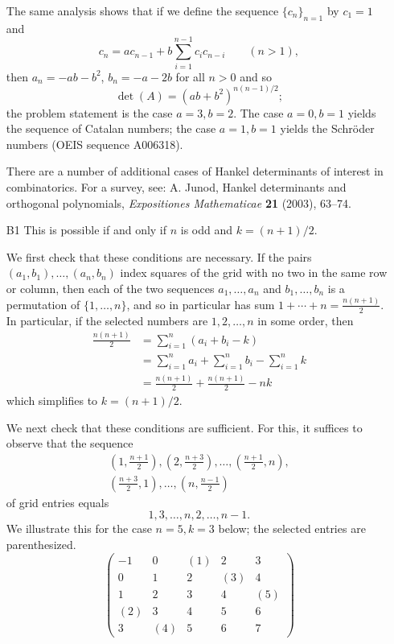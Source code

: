 \documentclass[amssymb,twocolumn,pra,10pt,aps]{revtex4-1}
\begin{document}
\begin{itemize}
The same analysis shows that if we define the sequence $\{c_n\}_{n=1}$ by
$c_1 = 1$ and
\[
c_n = a c_{n-1} + b \sum_{i=1}^{n-1} c_i c_{n-i} \qquad (n > 1),
\]
then  $a_n = -ab-b^2$, $b_n = -a-2b$ for all $n>0$ and so
\[
\det(A) = (ab+b^2)^{n(n-1)/2};
\]
the problem statement is the case $a=3, b=2$.
The case $a=0, b=1$ yields the sequence of Catalan numbers;
the case $a=1, b=1$ yields the Schr\"oder numbers (OEIS sequence A006318).

There are a number of additional cases of Hankel determinants of interest in combinatorics.
For a survey, see: A. Junod, Hankel determinants and orthogonal polynomials,
\textit{Expositiones Mathematicae} \textbf{21} (2003), 63--74.

\item[B1]
This is possible if and only if $n$ is odd and $k = (n+1)/2$.

We first check that these conditions are necessary. If the pairs $(a_1,b_1),\dots,(a_n,b_n)$
index squares of the grid with no two in the same row or column,
then each of the two sequences $a_1,\dots,a_n$
and $b_1,\dots,b_n$ is a permutation of $\{1,\dots,n\}$, and so in particular has sum $1 + \cdots +n = \frac{n(n+1)}{2}$. In particular, if the selected numbers are $1,2,\dots,n$ in some order, then
\begin{align*}
\frac{n(n+1)}{2} &= \sum_{i=1}^n (a_i+b_i-k) \\
&= \sum_{i=1}^n a_i + \sum_{i=1}^n b_i - \sum_{i=1}^n k \\
&= \frac{n(n+1)}{2} + \frac{n(n+1)}{2} - nk
\end{align*}
which simplifies to $k = (n+1)/2$.

We next check that these conditions are sufficient. For this, it suffices to observe that
the sequence
\begin{gather*}
\left(1, \frac{n+1}{2}\right), \left(2, \frac{n+3}{2}\right), \dots,
\left(\frac{n+1}{2}, n\right), \\
\left(\frac{n+3}{2}, 1\right), \dots, \left(n, \frac{n-1}{2}\right)
\end{gather*}
of grid entries equals
\[
1, 3, \dots, n, 2, \dots, n-1.
\]
We illustrate this for the case $n=5, k=3$ below; the selected entries are parenthesized.
\[
\begin{pmatrix}
-1 & 0 & (1) & 2 & 3 \\
0 & 1 & 2 & (3) & 4 \\
1 & 2 & 3 & 4 & (5) \\
(2) & 3 & 4 & 5 & 6 \\
3 & (4) & 5 & 6 & 7
\end{pmatrix}
\]


\end{itemize}
\end{document}
